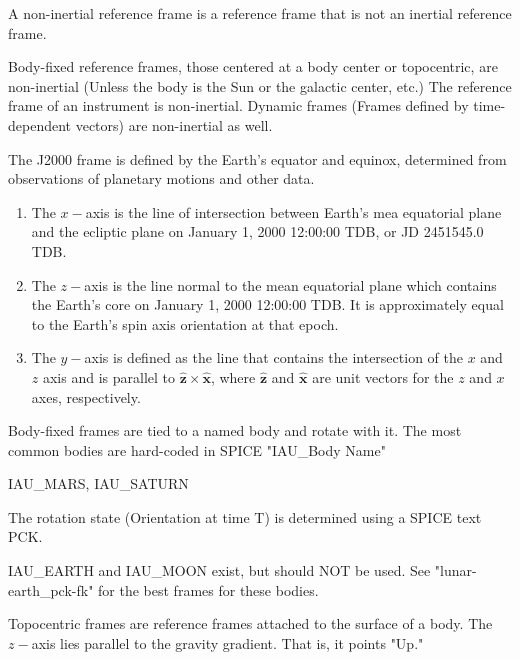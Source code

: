 \documentclass[crop=false,class=book]{standalone}
\begin{document}
            \begin{definition}
            A non-inertial reference frame is a reference frame that is not an inertial reference frame.
            \end{definition}
            \begin{example}
            Body-fixed reference frames, those centered at a body center or topocentric, are non-inertial (Unless the body is the Sun or the galactic center, etc.) The reference frame of an instrument is non-inertial. Dynamic frames (Frames defined by time-dependent vectors) are non-inertial as well.
            \end{example}
            \begin{definition}
            The J2000 frame is defined by the Earth's equator and equinox, determined from observations of planetary motions and other data. 
            \begin{enumerate}
                \item The $x-$axis is the line of intersection between Earth's mea equatorial plane and the ecliptic plane on January 1, 2000 12:00:00 TDB, or JD 2451545.0 TDB.
                \item The $z-$axis is the line normal to the mean equatorial plane which contains the Earth's core on January 1, 2000 12:00:00 TDB. It is approximately equal to the Earth's spin axis orientation at that epoch.
                \item The $y-$axis is defined as the line that contains the intersection of the $x$ and $z$ axis and is parallel to $\hat{\mathbf{z}}\times \hat{\mathbf{x}}$, where $\hat{\mathbf{z}}$ and $\hat{\mathbf{x}}$ are unit vectors for the $z$ and $x$ axes, respectively.
            \end{enumerate}
            \end{definition}
            Body-fixed frames are tied to a named body and rotate with it. The most common bodies are hard-coded in SPICE "IAU\_Body Name"
            \begin{example}
            IAU\_MARS, IAU\_SATURN
            \end{example}
            The rotation state (Orientation at time T) is determined using a SPICE text PCK. 
            \begin{remark}
            IAU\_EARTH and IAU\_MOON exist, but should NOT be used. See "lunar-earth\_pck-fk" for the best frames for these bodies.
            \end{remark}
            \begin{definition}
            Topocentric frames are reference frames attached to the surface of a body. The $z-$axis lies parallel to the gravity gradient. That is, it points "Up."
            \end{definition}
\end{document}
